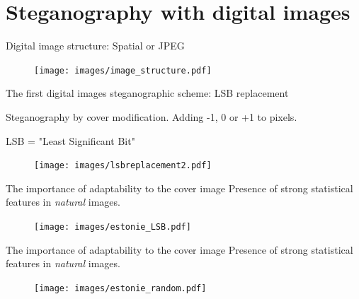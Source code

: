 \documentclass[10pt,aspectratio=169]{beamer}
\begin{document}


\section*{Steganography with digital images}

\begin{frame}{Digital image structure: Spatial or JPEG}

\begin{figure}[h]
\texttt{[image: images/image\_structure.pdf]}
\end{figure}
\end{frame}


\begin{frame}{The first digital images steganographic scheme: LSB replacement}

Steganography by cover modification. Adding -1, 0 or +1 to pixels.

\alert{LSB} = "\alert{L}east \alert{S}ignificant \alert{B}it"
\begin{figure}[h]
\texttt{[image: images/lsbreplacement2.pdf]}
\end{figure}
\end{frame}

\begin{frame}{The importance of adaptability to the cover image}
Presence of strong \alert{statistical features} in \textit{natural} images.
\begin{figure}[h]
\texttt{[image: images/estonie\_LSB.pdf]}
\end{figure}
\end{frame}

\begin{frame}{The importance of adaptability to the cover image}
Presence of strong \alert{statistical features} in \textit{natural} images.
\begin{figure}[h]
\texttt{[image: images/estonie\_random.pdf]}
\end{figure}
\end{frame}
\end{document}
